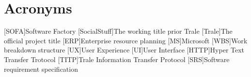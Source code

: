 \chapter{Acronyms}\label{ch:acronyms}
\begin{acronym}
    [SOFA]{Software Factory}
    [SocialStuff]{The working title prior Trale}
    [Trale]{The official project title}
    [ERP]{Enterprise resource planning}
    [MS]{Microsoft}
    [WBS]{Work breakdown structure}
    [UX]{User Experience}
    [UI]{User Interface}
    [HTTP]{Hyper Text Transfer Trotocol}
    [TITP]{Trale Information Transfer Protocol}
    [SRS]{Software requirement specification}
\end{acronym}
